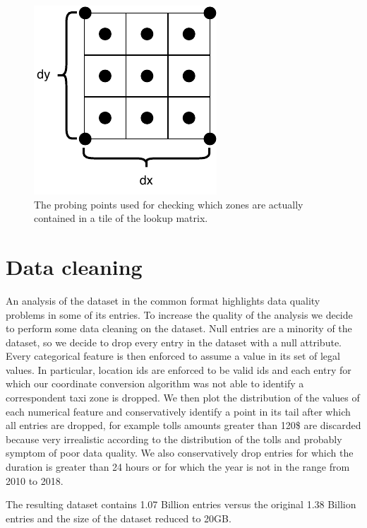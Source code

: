 \documentclass{acm_proc_article-sp-sigmod09}
\begin{document}
\begin{figure}
	\centering
	\includegraphics{resources/probing_points.pdf}
	\caption{The probing points used for checking which zones are actually contained in a tile of the lookup matrix.}
	\label{fig:probingPoints}
\end{figure}

\section{Data cleaning}

An analysis of the dataset in the common format highlights data quality problems in some of its entries. To increase the quality of the analysis we decide to perform some data cleaning on the dataset.
Null entries are a minority of the dataset, so we decide to drop every entry in the dataset with a null attribute. Every categorical feature is then enforced to assume a value in its set of legal values. In particular, location ids are enforced to be valid ids and each entry for which our coordinate conversion algorithm was not able to identify a correspondent taxi zone is dropped. We then plot the distribution of the values of each numerical feature and conservatively identify a point in its tail after which all entries are dropped, for example tolls amounts greater than 120\$ are discarded because very irrealistic according to the distribution of the tolls and probably symptom of poor data quality. We also conservatively drop entries for which the duration is greater than 24 hours or for which the year is not in the range from 2010 to 2018.

The resulting dataset contains 1.07 Billion entries versus the original 1.38 Billion entries and the size of the dataset reduced to 20GB.

\end{document}
